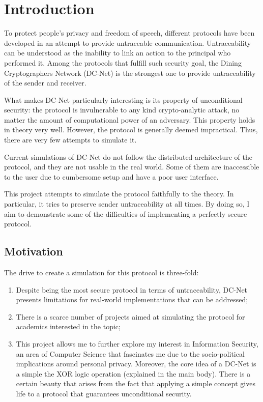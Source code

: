 \chapter{Introduction}


To protect people's privacy and freedom of speech, different protocols have been developed in an attempt to provide untraceable communication. Untraceability can be understood as the inability to link an action to the principal who performed it. Among the protocols that fulfill such security goal, the Dining Cryptographers Network (DC-Net) is the strongest one to provide untraceability of the sender and receiver. 

What makes DC-Net particularly interesting is its property of unconditional security: the protocol is invulnerable to any kind crypto-analytic attack, no matter the amount of computational power of an adversary. This property holds in theory very well. However, the protocol is generally deemed impractical. Thus, there are very few attempts to simulate it.

Current simulations of DC-Net do not follow the distributed architecture of the protocol, and they are not usable in the real world. Some of them are inaccessible to the user due to cumbersome setup and have a poor user interface.

This project attempts to simulate the protocol faithfully to the theory. In particular, it tries to preserve sender untraceability at all times. By doing so, I aim to demonstrate some of the difficulties of implementing a perfectly secure protocol.

\section{Motivation}
The drive to create a simulation for this protocol is three-fold: 

\begin{enumerate}
\item Despite being the most secure protocol in terms of untraceability, DC-Net presents limitations for real-world implementations that can be addressed;

\item There is a scarce number of projects aimed at simulating the protocol for academics interested in the topic;

\item This project allows me to further explore my interest in Information Security, an area of Computer Science that fascinates me due to the socio-political implications around personal privacy. Moreover, the core idea of a DC-Net is a simple the XOR logic operation (explained in the main body). There is a certain beauty that arises from the fact that applying a simple concept gives life to a protocol that guarantees unconditional security.
\end{enumerate}


